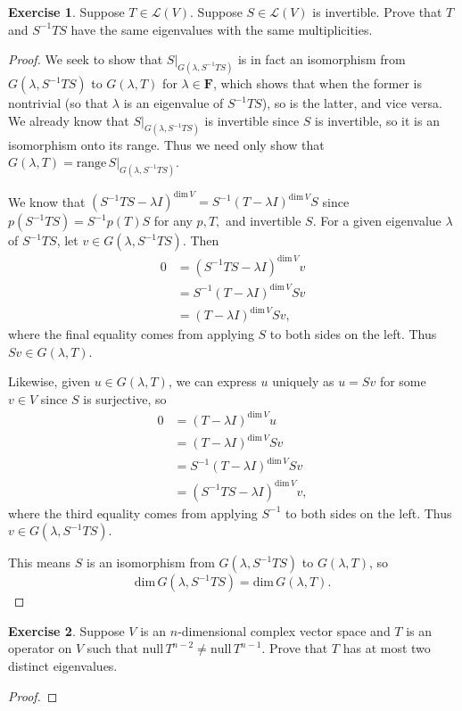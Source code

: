 \documentclass{article}
\theoremstyle{definition}
\newtheorem{ex}{Exercise}
\begin{document}
\begin{ex}
	Suppose $T \in \mathcal{L}(V)$. Suppose $S \in \mathcal{L}(V)$ is invertible. Prove that $T$ and $S^{-1}TS$ have the same eigenvalues with the same multiplicities.
\end{ex}
\begin{proof}
	We seek to show that $S|_{G(\lambda, S^{-1}TS)}$ is in fact an isomorphism from $G(\lambda, S^{-1}TS)$ to $G(\lambda, T)$ for $\lambda \in \mathbf{F}$, which shows that when the former is nontrivial (so that $\lambda$ is an eigenvalue of $S^{-1}TS$), so is the latter, and vice versa.
	We already know that $S|_{G(\lambda, S^{-1}TS)}$ is invertible since $S$ is invertible, so it is an isomorphism onto its range.
	Thus we need only show that $G(\lambda, T) = \mathrm{range}\,S|_{G(\lambda, S^{-1}TS)}$.

	We know that $(S^{-1}TS - \lambda I)^{\mathrm{dim}\,V} = S^{-1}(T - \lambda I)^{\mathrm{dim}\,V}S$ since $p(S^{-1}TS) = S^{-1}p(T)S$ for any $p, T,$ and invertible $S$.
	For a given eigenvalue $\lambda$ of $S^{-1}TS$, let $v \in G(\lambda, S^{-1}TS)$.
	Then \begin{align*}
		0 & = (S^{-1}TS - \lambda I)^{\mathrm{dim}\,V}v \\
		  & = S^{-1}(T - \lambda I)^{\mathrm{dim}\,V}Sv \\
		  & = (T - \lambda I)^{\mathrm{dim}\,V}Sv,
	\end{align*}
	where the final equality comes from applying $S$ to both sides on the left.
	Thus $Sv \in G(\lambda, T)$.

	Likewise, given $u \in G(\lambda, T)$, we can express $u$ uniquely as $u = Sv$ for some $v \in V$ since $S$ is surjective, so \begin{align*}
		0 & = (T - \lambda I)^{\mathrm{dim}\,V}u         \\
		  & = (T - \lambda I)^{\mathrm{dim}\,V}Sv        \\
		  & = S^{-1}(T - \lambda I)^{\mathrm{dim}\,V}Sv  \\
		  & = (S^{-1}TS - \lambda I)^{\mathrm{dim}\,V}v,
	\end{align*}
	where the third equality comes from applying $S^{-1}$ to both sides on the left.
	Thus $v \in G(\lambda, S^{-1}TS)$.

	This means $S$ is an isomorphism from $G(\lambda, S^{-1}TS)$ to $G(\lambda, T)$, so \begin{equation*}
		\mathrm{dim}\,G(\lambda, S^{-1}TS) = \mathrm{dim}\,G(\lambda, T).
	\end{equation*}
\end{proof}

\begin{ex}
	Suppose $V$ is an $n $-dimensional complex vector space and $T$ is an operator on $V$ such that $\mathrm{null}\,T^{n - 2} \neq \mathrm{null}\,T^{n - 1}$. Prove that $T$ has at most two distinct eigenvalues.
\end{ex}
\begin{proof}

\end{proof}
\end{document}
